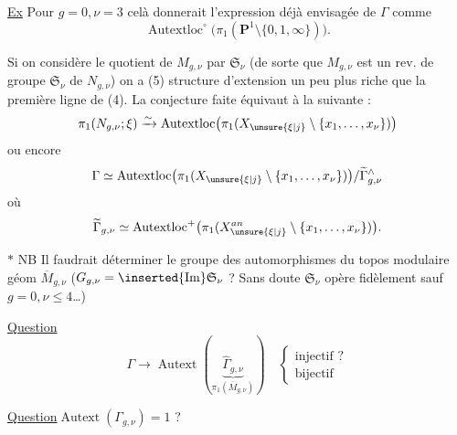 \uline{Ex} Pour $g=0,\nu=3$ celà donnerait l'expression déjà envisagée de $\Gamma$ comme
\[
\operatorname{Autextloc}^{\circ}\bigl(\pi_1(\mathbf P^1\setminus\{0,1,\infty\})\bigr).
\]

Si on considère le quotient  de $M_{g,\nu}$ par $\mathfrak S_\nu$ (de sorte que $M_{g,\nu}$ est un rev. de groupe $\mathfrak S_\nu$ de $N_{g,\nu}$) on a
\hfill(5)
structure d'extension un peu plus riche que la première ligne de (4). La conjecture faite équivaut à la suivante :
\[
\pi_1(N_{g,\nu};\xi)\xrightarrow{\sim}\operatorname{Autextloc}\bigl(\pi_1(X_{\unsure{\xi|j}}\setminus\{x_1,\ldots,x_\nu\})\bigr)
\]
ou encore
\[
\Gamma\simeq\operatorname{Autextloc}\bigl(\pi_1(X_{\unsure{\xi|j}}\setminus\{x_1,\ldots,x_\nu\})\bigr)/\widetilde\Gamma_{g,\nu}^{\wedge}
\]
où
\[
\widetilde\Gamma_{g,\nu}\simeq\operatorname{Autextloc}^{+}\bigl(\pi_1(X_{\unsure{\xi|j}}^{an}\setminus\{x_1,\ldots,x_\nu\})\bigr).
\]

$*$ NB Il faudrait déterminer le groupe des automorphismes  du topos modulaire géom $\overline M_{g,\nu}$  ($G_{g,\nu}=\inserted{\operatorname{Im}}\mathfrak S_\nu$ ? \unsure{\}} Sans doute $\mathfrak S_\nu$ opère fidèlement sauf $g=0,\nu\leq4$\ldots)

\uline{Question}
\[
\Gamma\longrightarrow\operatorname{Autext}\left(\underbrace{\widehat\Gamma_{g,\nu}}_{\pi_1(\overline M_{g,\nu})}\right)
\quad\left\{\begin{array}{l}\text{injectif ?}\\\text{bijectif}\end{array}\right.
\]

\uline{Question}\quad $\operatorname{Autext}(\Gamma_{g,\nu})=1$ ?

